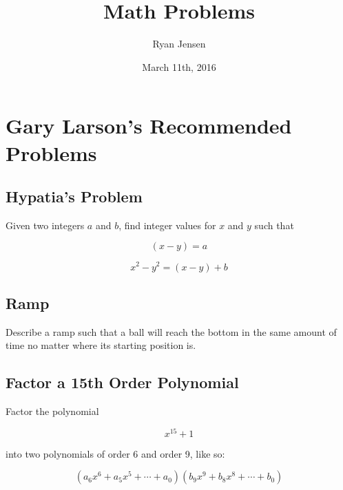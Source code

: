 \documentclass[letterpaper, margin=2in, 11pt]{report}
\numberwithin{equation}{section}
\begin{document}
	
	
	\author{Ryan Jensen}
	\title{Math Problems}
	\date{March 11th, 2016}
	\maketitle
	
	
	
	\tableofcontents
	
	
	
	\chapter{Gary Larson's Recommended Problems}
	
		\section{Hypatia's Problem}
			
			Given two integers \(a\) and \(b\), find integer values for \(x\) and \(y\) such that
			
			\begin{equation}
				(x-y) = a
			\end{equation}
			
			\begin{equation}
				x^2 - y^2 = (x-y) + b
			\end{equation}
			
			
		\section{Ramp}
			
			Describe a ramp such that a ball will reach the bottom in the same amount of time no matter where its starting position is.
			
			
		\section{Factor a 15th Order Polynomial}
			
			Factor the polynomial
			
			\begin{equation}
				x^{15} + 1
			\end{equation}
			
			into two polynomials of order 6 and order 9, like so:
			
			\begin{equation}
				(a_6x^6 + a_5x^5 + \cdots + a_0)(b_9x^9 + b_8x^8 + \cdots + b_0)
			\end{equation}
			
		
	
\end{document}
